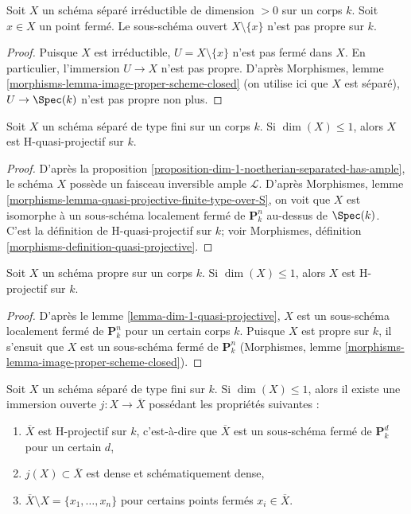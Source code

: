 \begin{lemma}
\label{lemma-proper-minus-point}
Soit $X$ un schéma séparé irréductible de dimension $> 0$ sur un corps $k$.
Soit $x \in X$ un point fermé. Le sous-schéma ouvert $X \setminus \{x\}$
n'est pas propre sur $k$.
\end{lemma}

\begin{proof}
Puisque $X$ est irréductible, $U = X \setminus \{x\}$ n'est pas fermé dans $X$.
En particulier, l'immersion $U \to X$ n'est pas propre.
D'après Morphismes, lemme \ref{morphisms-lemma-image-proper-scheme-closed}
(on utilise ici que $X$ est séparé), $U \to \Spec(k)$ n'est pas propre non plus.
\end{proof}

\begin{lemma}
\label{lemma-dim-1-quasi-projective}
Soit $X$ un schéma séparé de type fini sur un corps $k$.
Si $\dim(X) \leq 1$, alors $X$ est H-quasi-projectif sur $k$.
\end{lemma}

\begin{proof}
D'après la proposition \ref{proposition-dim-1-noetherian-separated-has-ample},
le schéma $X$ possède un faisceau inversible ample $\mathcal{L}$.
D'après Morphismes, lemme \ref{morphisms-lemma-quasi-projective-finite-type-over-S},
on voit que $X$ est isomorphe à un sous-schéma localement
fermé de $\mathbf{P}^n_k$ au-dessus de $\Spec(k)$. C'est
la définition de H-quasi-projectif sur $k$; voir
Morphismes, définition \ref{morphisms-definition-quasi-projective}.
\end{proof}

\begin{lemma}
\label{lemma-dim-1-proper-projective}
Soit $X$ un schéma propre sur un corps $k$.
Si $\dim(X) \leq 1$, alors $X$ est H-projectif sur $k$.
\end{lemma}

\begin{proof}
D'après le lemme \ref{lemma-dim-1-quasi-projective}, $X$ est un
sous-schéma localement fermé de $\mathbf{P}^n_k$ pour un certain corps $k$.
Puisque $X$ est propre sur $k$, il s'ensuit que $X$ est un sous-schéma fermé
de $\mathbf{P}^n_k$
(Morphismes, lemme \ref{morphisms-lemma-image-proper-scheme-closed}).
\end{proof}

\begin{lemma}
\label{lemma-dim-1-projective-completion}
Soit $X$ un schéma séparé de type fini sur $k$.
Si $\dim(X) \leq 1$, alors il existe une immersion ouverte
$j : X \to \overline{X}$ possédant les propriétés suivantes :
\begin{enumerate}
\item $\overline{X}$ est H-projectif sur $k$, c'est-à-dire que $\overline{X}$
est un sous-schéma fermé de $\mathbf{P}^d_k$ pour un certain $d$,
\item $j(X) \subset \overline{X}$ est dense et schématiquement
dense,
\item $\overline{X} \setminus X = \{x_1, \ldots, x_n\}$
pour certains points fermés $x_i \in \overline{X}$.
\end{enumerate}
\end{lemma}

